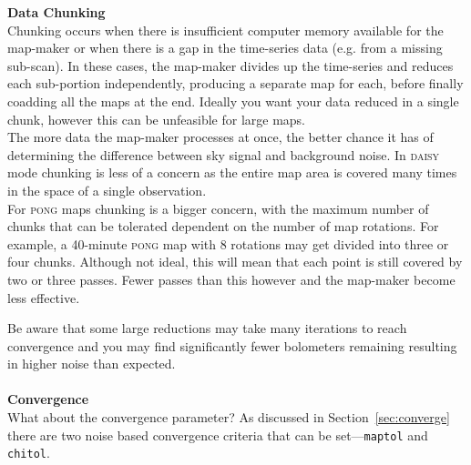 \documentclass[twoside,11pt]{article}
\newcommand{\htmlref}[2]{#1}
\newenvironment{latexonly}{}{}
\newcommand{\latexhtml}[2]{#1}
\renewcommand{\_}{\texttt{\symbol{95}}}
\newenvironment{fmpage}[1]{\begin{lrbox}{\fmbox}\begin{minipage}{#1}}{\end{minipage}\end{lrbox}\fbox{\usebox{\fmbox}}}
\newcommand{\cref}[3]{\latexhtml{#1~\ref{#2}}{\htmlref{#3}{#2}}}
\begin{document}
\begin{latexonly}
\begin{center}
\begin{fmpage}{0.92\linewidth}
\label{page:text}
\begin{minipage}[t!]{0.025\linewidth}
\hspace{0.1cm}
\end{minipage}
\begin{minipage}[t!]{0.93\linewidth}
\vspace{0.2cm}
\textbf{Data Chunking}\\
Chunking occurs when there is insufficient computer memory available
for the map-maker or when there is a gap in the time-series data (e.g.
from a missing sub-scan). In these cases, the map-maker divides up the
time-series and reduces each sub-portion independently, producing a
separate map for each, before finally coadding all the maps at the
end. Ideally you want your data reduced in a single chunk, however
this can be unfeasible for large maps.
\vspace{0.2cm}\\
The more data the map-maker processes at once, the better chance it
has of determining the difference between sky signal and background
noise. In \textsc{daisy} mode chunking is less of a concern as
the entire map area is covered many times in the space of a single
observation.
\vspace{0.2cm}\\
For \textsc{pong} maps chunking is a bigger concern, with the
maximum number of chunks that can be tolerated dependent on the number
of map rotations. For example, a 40-minute \textsc{pong} map with 8
rotations may get divided into three or four chunks. Although not
ideal, this will mean that each point is still covered by two or three
passes. Fewer passes than this however and the map-maker become less
effective.
\vspace{0.2cm}
\end{minipage}
\begin{minipage}[t!]{0.025\linewidth}
\hspace{0.1cm}
\end{minipage}
\end{fmpage}
\end{center}
\end{latexonly}

Be aware that some large reductions may take many iterations to reach
convergence and you may find significantly fewer bolometers remaining
resulting in higher noise than expected.
\\ \\
\textbf{Convergence}\\
What about the convergence parameter? As discussed in
\cref{Section}{sec:converge}{Convergence} there are two noise based
convergence criteria that can be set---\texttt{maptol} and \texttt{chitol}. 
\end{document}
